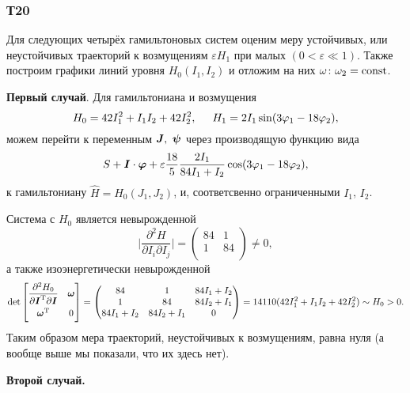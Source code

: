 \subsubsection*{Т20}


Для следующих четырёх гамильтоновых систем оценим меру устойчивых, или неустойчивых траекторий к возмущениям $\varepsilon H_1$ при малых $(0 < \varepsilon \ll 1)$. Также построим графики линий уровня $H_0 (I_1, I_2)$ и отложим на них $\omega \colon  \omega_2 = \text{const}$. 


\textbf{Первый случай}. Для гамильтониана и возмущения
\begin{equation*}
    H_0 = 42 I_1^2 + I_1 I_2 + 42 I_2^2, \hspace{5 mm} H_1 = 2 I_1 \sin(3 \varphi_1 - 18 \varphi_2),
\end{equation*}
можем перейти к переменным $\mbox{\boldmath $J$}, \ \mbox{\boldmath $\psi$}$ через производящую функцию вида
\begin{equation*}
    S + \mbox{\boldmath $I$} \cdot \mbox{\boldmath $\varphi$} + \varepsilon \frac{18}{5} \frac{2I_1}{84 I_1 + I_2} \cos(3 \varphi_1 - 18 \varphi_2),
\end{equation*}
к гамильтониану $\hat{H} = H_0(J_1, J_2)$, и, соответсвенно ограниченными $I_1$, $I_2$. 

Система с $H_0$ является невырожденной 
\begin{equation*}
    \bigg| \frac{\partial^2 H}{\partial I_i \partial I_j} \bigg| = 
    \begin{pmatrix}
        84 & 1  \\
        1 & 84  \\
    \end{pmatrix} \neq 0,
\end{equation*}
а также изоэнергетически невырожденной
\begin{equation*}
     \det \begin{bmatrix}
        \vphantom{\dfrac{1}{2}}
            \dfrac{\partial^2 H_0}{\partial \vc{I}\T \partial \vc{I}} & \vc{\omega} \\
        \vphantom{\dfrac{1}{2}}
            \vc{\omega}\T & 0
        \end{bmatrix} = \begin{pmatrix}
            84 & 1 & 84 I_1 + I_2 \\
            1 & 84 & 84 I_2 + I_1 \\
            84 I_1 + I_2 & 84 I_2 + I_1 & 0 \\
        \end{pmatrix} = 14110 (42 I_1^2 + I_1 I_2 + 42 I_2^2) \sim H_0 > 0.
\end{equation*}
Таким образом мера траекторий, неустойчивых к возмущениям, равна нуля (а вообще выше мы показали, что их здесь нет).


\textbf{Второй случай.}



